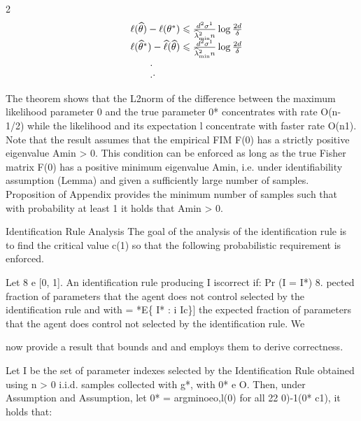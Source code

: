 \documentclass{article}
\begin{document}
\begin{paracol}{2}
\begin{equation}
\begin{array} { r l } & { \ell ( \widehat { \theta } ) - \ell ( \theta ^ { * } ) \leqslant \frac { d ^ { 2 } \sigma ^ { 1 } } { \widehat { \lambda } _ { \operatorname* { m i n } } ^ { 2 } n } \log \frac { 2 d } { \delta } } \\ & { \ell ( \widehat { \theta } ^ { * } ) - \widehat { \ell } ( \widehat { \theta } ) \leqslant \frac { d ^ { 2 } \sigma ^ { 1 } } { \widehat { \lambda } _ { \operatorname* { m i n } } ^ { 2 } n } \log \frac { 2 d } { \delta } } \\ & { \qquad. } \\ & { \qquad. \cdot }\end{array}
\end{equation}


The theorem shows that the L2norm of the difference between the maximum likelihood parameter 0 and the true parameter 0* concentrates with rate O(n-1/2) while the likelihood  and its expectation l concentrate with faster rate
O(n1). Note that the result assumes that the empirical FIM
F(0) has a strictly positive eigenvalue Amin > 0. This condition can be enforced as long as the true Fisher matrix F(0)
has a positive minimum eigenvalue Amin, i.e. under identifiability assumption (Lemma) and given a sufficiently large
number of samples. Proposition of Appendix provides the
minimum number of samples such that with probability at
least 1   it holds that Amin > 0.


Identification Rule Analysis The goal of the analysis of
the identification rule is to find the critical value c(1) so that
the following probabilistic requirement is enforced.


Let 8 e [0, 1]. An identification rule producing I iscorrect if: Pr (I = I*)  8.
pected fraction of parameters that the agent does not control
selected by the identification rule and with  = *E\{ 
I* : i  Ic\}] the expected fraction of parameters that the
agent does control not selected by the identification rule. We

\switchcolumn
\RaggedRight

now provide a result that bounds  and  and employs them
to derive correctness.


Let I be the set of parameter indexes selected by the
Identification Rule obtained using n > 0 i.i.d. samples
collected with g*, with 0* e O. Then, under Assumption and Assumption, let 0* = argminoeo,l(0) for all
22
0)-1(0* c1), it holds that:



\end{paracol}
\end{document}
